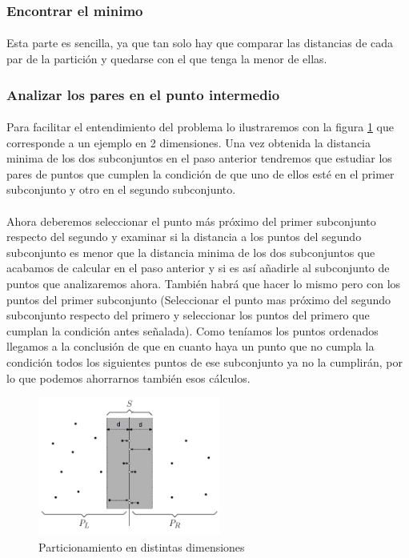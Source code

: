 \documentclass{article}
\begin{document}
		\subsubsection{Encontrar el minimo}

			\paragraph{}
			Esta parte es sencilla, ya que tan solo hay que comparar las distancias de cada par de la partición y quedarse con el que tenga la menor de ellas.

		\subsubsection{Analizar los pares en el punto intermedio}

			\paragraph{}
			Para facilitar el entendimiento del problema lo ilustraremos con la figura \ref{example_border} que corresponde a un ejemplo en 2 dimensiones. Una vez obtenida la distancia minima de los dos subconjuntos en el paso anterior tendremos que estudiar los pares de puntos que cumplen la condición de que uno de ellos esté en el primer subconjunto y otro en el segundo subconjunto.
			
			\paragraph{}
			Ahora deberemos seleccionar el punto más próximo del primer subconjunto respecto del segundo y examinar si la distancia a los puntos del segundo subconjunto es menor que la distancia minima de los dos subconjuntos  que acabamos de calcular en el paso anterior y si es así añadirle al subconjunto de puntos que analizaremos ahora. También habrá que hacer lo mismo pero con los puntos del primer subconjunto (Seleccionar el punto mas próximo del segundo subconjunto respecto del primero y seleccionar los puntos del primero que cumplan la condición antes señalada). Como teníamos los puntos ordenados llegamos a la conclusión de que en cuanto haya un punto que no cumpla la condición todos los siguientes puntos de ese subconjunto ya no la cumplirán, por lo que podemos ahorrarnos también esos cálculos.
			
			\begin{figure}[H]
				\centering
				\includegraphics[width=60mm]{strip_closesr1.png}
				\caption{Particionamiento en distintas dimensiones \label{example_border}}
			\end{figure}
			
\end{document}
